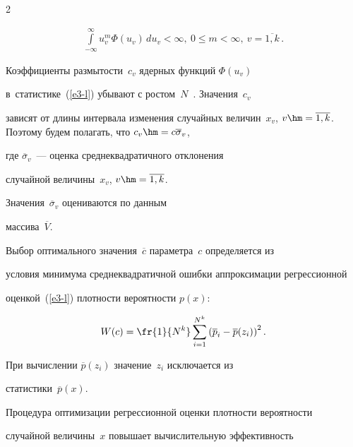 \begin{multicols}{2}
\begin{enumerate}[1.]
\begin{multline*}
\int\limits_{-\infty}^\infty u_v^m \Phi(u_v)\,du_v< \infty,\ 0\leq m< \infty,\ 


v=\overline{1,k}\,.


\end{multline*}


  \end{enumerate}


  


  \vspace*{-6pt}


  


  Коэффициенты размытости~$c_v$ ядерных функций $\Phi (u_v)$ 


в~статистике~(\ref{e3-l}) убывают с ростом~$N$~\cite{10-l}. Значения~$c_v$ 


зависят от длины интервала изменения случайных величин~$x_v$, $v\hm= 


\overline{1,k}$. Поэтому будем полагать, что $c_v\hm= c\overline{\sigma}_v$, 


где $\overline{\sigma}_v$~--- оценка сред\-не\-квад\-ра\-тич\-но\-го отклонения 


случайной величины~$x_v$, $v\hm=\overline{1,k}$. 


Значения~$\overline{\sigma}_v$ оцениваются по данным 


массива~$\overline{V}$.


  


  Выбор оптимального значения~$\overline{c}$ параметра~$c$ определяется из 


условия минимума сред\-не\-квад\-ра\-тич\-ной ошибки аппроксимации регрессионной 


оценкой~(\ref{e3-l}) плотности вероятности $p(x)$:


  $$


  W(c)=\fr{1}{N^k}\sum\limits_{i=1}^{N^k} \left( \overline{p}_i- 


\overline{p}(z_i)\right)^2.


  $$




  При вычислении $\overline{p}(z_i)$ значение~$z_i$ исключается из 


статистики~$\overline{p}(x)$.


  


  Процедура оптимизации регрессионной оценки плотности вероятности 


случайной величины~$x$ повышает вычислительную эффективность 



\end{multicols}
